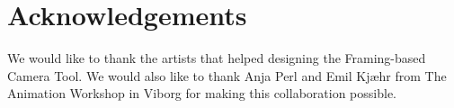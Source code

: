 \section{Acknowledgements}
We would like to thank the artists that helped designing the Framing-based Camera Tool. We would also like to thank Anja Perl and Emil Kj\ae hr from The Animation Workshop in Viborg for making this collaboration possible.